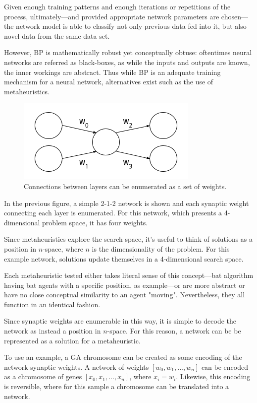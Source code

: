 \documentclass[a4paper,12pt]{article}
\begin{document}
Given enough training patterns and enough iterations or repetitions of the process, ultimately---and provided appropriate network parameters are chosen---the network model is able to classify not only previous data fed into it, but also novel data from the same data set.

However, BP is mathematically robust yet conceptually obtuse: oftentimes neural networks are referred as black-boxes, as while the inputs and outputs are known, the inner workings are abstract. Thus while BP is an adequate training mechanism for a neural network, alternatives exist such as the use of metaheuristics.

\begin{figure}[h!]
\centering
\includegraphics[scale=0.65]{images/weight-visualization.png}
\caption{Connections between layers can be enumerated as a set of weights.}
\label{fig:weight-vis}
\end{figure}

In the previous figure, a simple 2-1-2 network is shown and each synaptic weight connecting each layer is enumerated. For this network, which presents a 4-dimensional problem space, it has four weights.

Since metaheuristics explore the search space, it's useful to think of solutions as a position in $n$-space, where $n$ is the dimensionality of the problem. For this example network, solutions update themselves in a 4-dimensional search space.

Each metaheuristic tested either takes literal sense of this concept---bat algorithm having bat agents with a specific position, as example---or are more abstract or have no close conceptual similarity to an agent "moving". Nevertheless, they all function in an identical fashion.

Since synaptic weights are enumerable in this way, it is simple to decode the network as instead a position in $n$-space. For this reason, a network can be be represented as a solution for a metaheuristic.

To use an example, a GA chromosome can be created as some encoding of the network synaptic weights. A network of weights $[w_0, w_1, ..., w_n]$ can be encoded as a chromosome of genes $[x_0, x_1, ..., x_n]$, where $x_i = w_i$. Likewise, this encoding is reversible, where for this sample a chromosome can be translated into a network.
\end{document}
